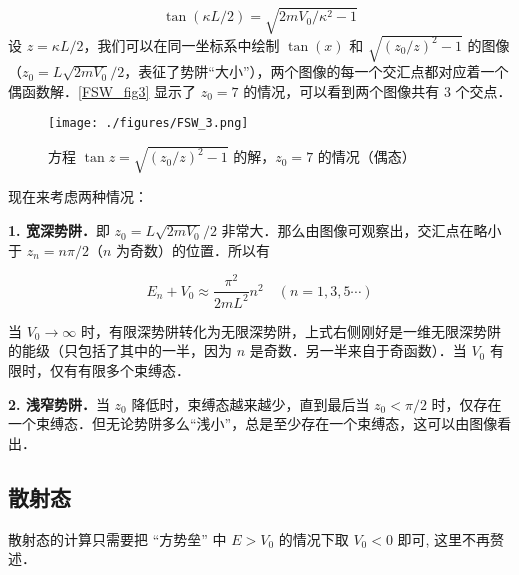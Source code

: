\begin{equation}
\tan(\kappa L/2)=\sqrt{2mV_0/\kappa^2-1}
\end{equation}
设 $z=\kappa L/2$，我们可以在同一坐标系中绘制 $\tan(x)$ 和 $\sqrt{(z_0/z)^2-1}$ 的图像（$z_0=L\sqrt{2mV_0}/2$，表征了势阱“大小”），两个图像的每一个交汇点都对应着一个偶函数解．\autoref{FSW_fig3} 显示了 $z_0=7$ 的情况，可以看到两个图像共有 $3$ 个交点．

\begin{figure}[ht]
\centering
\texttt{[image: ./figures/FSW\_3.png]}
\caption{方程 $\tan z=\sqrt{(z_0/z)^2-1}$ 的解，$z_0=7$ 的情况（偶态）} \label{FSW_fig3}
\end{figure}

现在来考虑两种情况：

\textbf{1. 宽深势阱．}即 $z_0=L\sqrt{2mV_0}/2$ 非常大．那么由图像可观察出，交汇点在略小于 $z_n=n\pi/2$（$n$ 为奇数）的位置．所以有

\begin{equation}
E_n+V_0\approx \frac{\pi^2}{2mL^2}n^2\quad (n=1,3,5\cdots)
\end{equation}

当 $V_0\rightarrow \infty$ 时，有限深势阱转化为无限深势阱，上式右侧刚好是一维无限深势阱的能级（只包括了其中的一半，因为 $n$ 是奇数．另一半来自于奇函数）．当 $V_0$ 有限时，仅有有限多个束缚态．

\textbf{2. 浅窄势阱．}当 $z_0$ 降低时，束缚态越来越少，直到最后当 $z_0<\pi/2$ 时，仅存在一个束缚态．但无论势阱多么“浅小”，总是至少存在一个束缚态，这可以由图像看出．

\subsection{散射态}

散射态的计算只需要把 “方势垒” 中 $E > V_0$ 的情况下取 $V_0 < 0$ 即可, 这里不再赘述．
